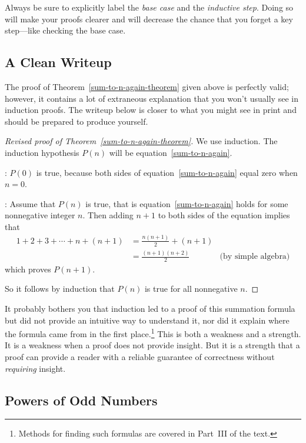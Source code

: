 Always be sure to explicitly label the \emph{base case} and the
\emph{inductive step}.  Doing so will make your proofs clearer and
will decrease the chance that you forget a key step---like checking
the base case.

\subsection{A Clean Writeup}

The proof of Theorem~\ref{sum-to-n-again-theorem} given above is
perfectly valid; however, it contains a lot of extraneous explanation
that you won't usually see in induction proofs.  The writeup below is
closer to what you might see in print and should be prepared to
produce yourself.

\begin{proof}[Revised proof of Theorem~\ref{sum-to-n-again-theorem}]
We use induction.  The induction hypothesis $P(n)$ will be
equation~\eqref{sum-to-n-again}.

: $P(0)$ is true, because both sides of
equation~\eqref{sum-to-n-again} equal zero when $n=0$.

: Assume that $P(n)$ is true, that is
equation~\eqref{sum-to-n-again} holds for some nonnegative integer
$n$.  Then adding $n+1$ to both sides of the equation implies that
\begin{align*}
1 + 2 + 3 + \cdots + n + (n+1)
    & = \frac{n(n+1)}{2} + (n+1)\\\iffalse  & \text{(by induction hypothesis)} \fi
    & = \frac{(n+1)(n+2)}{2}  & \text{(by simple algebra)}
\end{align*}
which proves $P(n+1)$.

So it follows by induction that $P(n)$ is true for all nonnegative $n$.
\end{proof}

It probably bothers you that induction led to a proof of this
summation formula but did not provide an intuitive way to understand
it, nor did it explain where the formula came from in the first
place.\footnote{Methods for finding such formulas are covered in
  Part~III of the text.}  This is both a weakness and a strength.  It
is a weakness when a proof does not provide insight.  But it is a
strength that a proof can provide a reader with a reliable guarantee
of correctness without \emph{requiring} insight.

\iffalse
\subsection{Powers of Odd Numbers}

